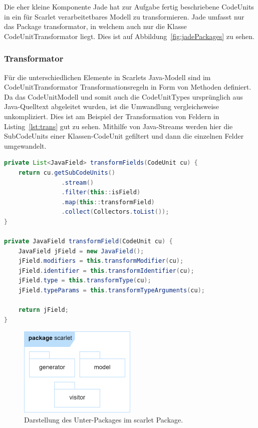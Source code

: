 \documentclass[12pt,oneside,a4paper,parskip]{scrbook}
\begin{document}
Die eher kleine Komponente Jade hat zur Aufgabe fertig beschriebene CodeUnits in ein für Scarlet verarbeitetbares Modell zu transformieren. Jade umfasst nur das Package transformator, in welchem auch nur die Klasse CodeUnitTransformator liegt. Dies ist auf Abbildung~\ref{fig:jadePackages} zu sehen.

\subsubsection{Transformator}

Für die unterschiedlichen Elemente in Scarlets Java-Modell sind im CodeUnitTransformator Transformationsregeln in Form von Methoden definiert. Da das CodeUnitModell und somit auch die CodeUnitTypes ursprünglich aus Java-Quelltext abgeleitet wurden, ist die Umwandlung vergleichsweise unkompliziert. Dies ist am Beispiel der Transformation von Feldern in Listing~\ref{lst:trans} gut zu sehen. Mithilfe von Java-Streams werden hier die SubCodeUnits einer Klassen-CodeUnit gefiltert und dann die einzelnen Felder umgewandelt.

\begin{lstlisting}[label=lst:trans,
language=java,
firstnumber=1,
caption=Umwandlung der Felder in den SubCodeUnits einer CodeUnit. Auszug aus der Klasse CodeUnitTransformator.]
private List<JavaField> transformFields(CodeUnit cu) {
	return cu.getSubCodeUnits()
				.stream()
				.filter(this::isField)
				.map(this::transformField)
				.collect(Collectors.toList());
}

private JavaField transformField(CodeUnit cu) {
	JavaField jField = new JavaField();
	jField.modifiers = this.transformModifier(cu);
	jField.identifier = this.transformIdentifier(cu);
	jField.type = this.transformType(cu);
	jField.typeParams = this.transformTypeArguments(cu);
	
	return jField;
}
\end{lstlisting}

\begin{figure}[htbp]
	\centering
	\includegraphics[width=0.5\textwidth]{bilder/scarlet}
	\caption{Darstellung des Unter-Packages im scarlet Package.}
	\label{fig:scarletPackages}
\end{figure}
\end{document}
